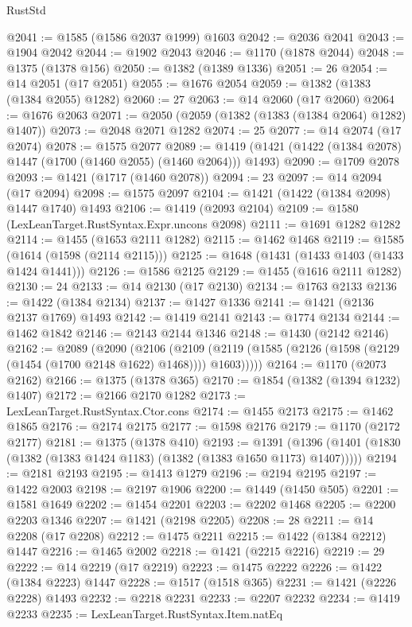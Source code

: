 \begin{lexlean}{RustStd}
\begin{coremodule}
@2041 := @1585 (@1586 @2037 @1999) @1603
@2042 := @2036 @2041
@2043 := @1904 @2042
@2044 := @1902 @2043
@2046 := @1170 (@1878 @2044)
@2048 := @1375 (@1378 @156)
@2050 := @1382 (@1389 @1336)
@2051 := 26
@2054 := @14 @2051 (@17 @2051)
@2055 := @1676 @2054
@2059 := @1382 (@1383 (@1384 @2055) @1282)
@2060 := 27
@2063 := @14 @2060 (@17 @2060)
@2064 := @1676 @2063
@2071 := @2050 (@2059 (@1382 (@1383 (@1384 @2064) @1282) @1407))
@2073 := @2048 @2071 @1282
@2074 := 25
@2077 := @14 @2074 (@17 @2074)
@2078 := @1575 @2077
@2089 := @1419 (@1421 (@1422 (@1384 @2078) @1447 (@1700 (@1460 @2055) (@1460 @2064))) @1493)
@2090 := @1709 @2078
@2093 := @1421 (@1717 (@1460 @2078))
@2094 := 23
@2097 := @14 @2094 (@17 @2094)
@2098 := @1575 @2097
@2104 := @1421 (@1422 (@1384 @2098) @1447 @1740) @1493
@2106 := @1419 (@2093 @2104)
@2109 := @1580 (LexLeanTarget.RustSyntax.Expr.uncons @2098)
@2111 := @1691 @1282 @1282
@2114 := @1455 (@1653 @2111 @1282)
@2115 := @1462 @1468
@2119 := @1585 (@1614 (@1598 (@2114 @2115)))
@2125 := @1648 (@1431 (@1433 @1403 (@1433 @1424 @1441)))
@2126 := @1586 @2125
@2129 := @1455 (@1616 @2111 @1282)
@2130 := 24
@2133 := @14 @2130 (@17 @2130)
@2134 := @1763 @2133
@2136 := @1422 (@1384 @2134)
@2137 := @1427 @1336
@2141 := @1421 (@2136 @2137 @1769) @1493
@2142 := @1419 @2141
@2143 := @1774 @2134
@2144 := @1462 @1842
@2146 := @2143 @2144 @1346
@2148 := @1430 (@2142 @2146)
@2162 := @2089
    (@2090
      (@2106
        (@2109 (@2119 (@1585 (@2126 (@1598 (@2129 (@1454 (@1700 @2148 @1622) @1468)))) @1603)))))
@2164 := @1170 (@2073 @2162)
@2166 := @1375 (@1378 @365)
@2170 := @1854 (@1382 (@1394 @1232) @1407)
@2172 := @2166 @2170 @1282
@2173 := LexLeanTarget.RustSyntax.Ctor.cons
@2174 := @1455 @2173
@2175 := @1462 @1865
@2176 := @2174 @2175
@2177 := @1598 @2176
@2179 := @1170 (@2172 @2177)
@2181 := @1375 (@1378 @410)
@2193 := @1391 (@1396 (@1401 (@1830 (@1382 (@1383 @1424 @1183) (@1382 (@1383 @1650 @1173) @1407)))))
@2194 := @2181 @2193
@2195 := @1413 @1279
@2196 := @2194 @2195
@2197 := @1422 @2003
@2198 := @2197 @1906
@2200 := @1449 (@1450 @505)
@2201 := @1581 @1649
@2202 := @1454 @2201
@2203 := @2202 @1468
@2205 := @2200 @2203 @1346
@2207 := @1421 (@2198 @2205)
@2208 := 28
@2211 := @14 @2208 (@17 @2208)
@2212 := @1475 @2211
@2215 := @1422 (@1384 @2212) @1447
@2216 := @1465 @2002
@2218 := @1421 (@2215 @2216)
@2219 := 29
@2222 := @14 @2219 (@17 @2219)
@2223 := @1475 @2222
@2226 := @1422 (@1384 @2223) @1447
@2228 := @1517 (@1518 @365)
@2231 := @1421 (@2226 @2228) @1493
@2232 := @2218 @2231
@2233 := @2207 @2232
@2234 := @1419 @2233
@2235 := LexLeanTarget.RustSyntax.Item.natEq

\end{coremodule}
\end{lexlean}
